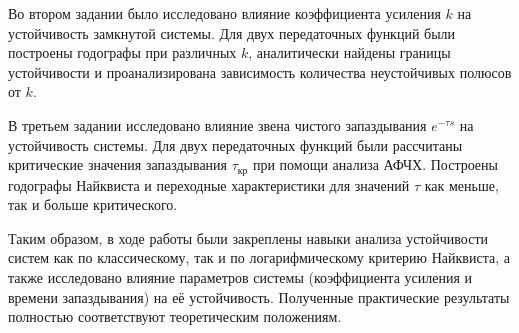 \documentclass[a5paper, 10pt]{article}
\theoremstyle{definition}
\theoremstyle{plain}
\theoremstyle{remark}
\begin{document}
Во втором задании было исследовано влияние коэффициента усиления \(k\) на устойчивость замкнутой системы. Для двух передаточных функций были построены годографы при различных \(k\), аналитически найдены границы устойчивости и проанализирована зависимость количества неустойчивых полюсов от \(k\). 

В третьем задании исследовано влияние звена чистого запаздывания \(e^{-\tau s}\) на устойчивость системы. Для двух передаточных функций были рассчитаны критические значения запаздывания \(\tau_{\text{кр}}\) при помощи анализа АФЧХ. Построены годографы Найквиста и переходные характеристики для значений \(\tau\) как меньше, так и больше критического. 

Таким образом, в ходе работы были закреплены навыки анализа устойчивости систем как по классическому, так и по логарифмическому критерию Найквиста, а также исследовано влияние параметров системы (коэффициента усиления и времени запаздывания) на её устойчивость. Полученные практические результаты полностью соответствуют теоретическим положениям.
\end{document}
